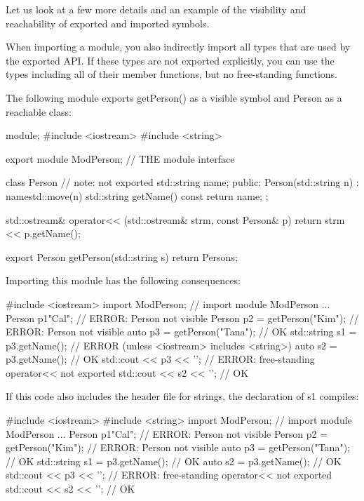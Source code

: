 Let us look at a few more details and an example of the visibility and reachability of exported and imported symbols.

When importing a module, you also indirectly import all types that are used by the exported API. If these types are not exported explicitly, you can use the types including all of their member functions, but no free-standing functions.

The following module exports getPerson() as a visible symbol and Person as a reachable class:


\begin{cpp}
module;
#include <iostream>
#include <string>

export module ModPerson; // THE module interface

class Person { // note: not exported
	std::string name;
public:
	Person(std::string n)
	: name{std::move(n)} {
	}
	std::string getName() const {
		return name;
	}
};

std::ostream& operator<< (std::ostream& strm, const Person& p)
{
	return strm << p.getName();
}

export Person getPerson(std::string s) {
	return Person{s};
}
\end{cpp}

Importing this module has the following consequences:

\begin{cpp}
#include <iostream>
import ModPerson; // import module ModPerson
...
Person p1{"Cal"}; // ERROR: Person not visible
Person p2 = getPerson("Kim"); // ERROR: Person not visible
auto p3 = getPerson("Tana"); // OK
std::string s1 = p3.getName(); // ERROR (unless <iostream> includes <string>)
auto s2 = p3.getName(); // OK
std::cout << p3 << '\n'; // ERROR: free-standing operator<< not exported
std::cout << s2 << '\n'; // OK
\end{cpp}

If this code also includes the header file for strings, the declaration of s1 compiles:

\begin{cpp}
#include <iostream>
#include <string>
import ModPerson; // import module ModPerson
...
Person p1{"Cal"}; // ERROR: Person not visible
Person p2 = getPerson("Kim"); // ERROR: Person not visible
auto p3 = getPerson("Tana"); // OK
std::string s1 = p3.getName(); // OK
auto s2 = p3.getName(); // OK
std::cout << p3 << '\n'; // ERROR: free-standing operator<< not exported
std::cout << s2 << '\n'; // OK
\end{cpp}

